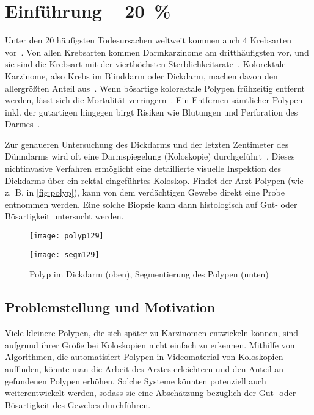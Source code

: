 \chapter{Einführung -- 20~\%}

Unter den 20 häufigsten Todesursachen weltweit kommen auch 4 Krebsarten vor~\cite{Lozano.2012}.
Von allen Krebsarten kommen Darmkarzinome am dritthäufigsten vor, und sie sind die Krebsart mit der vierthöchsten Sterblichkeitsrate~\cite{Ferlay.2012}.
Kolorektale Karzinome, also Krebs im Blinddarm oder Dickdarm, machen davon den allergrößten Anteil aus~\cite{Kumar.2005}.
Wenn bösartige kolorektale Polypen frühzeitig entfernt werden, lässt sich die Mortalität verringern~\cite{Zauber.2012}.
Ein Entfernen sämtlicher Polypen inkl. der gutartigen hingegen birgt Risiken wie Blutungen und Perforation des Darmes~\cite{Rex.2009}.

Zur genaueren Untersuchung des Dickdarms und der letzten Zentimeter des Dünndarms wird oft eine Darmspiegelung (Koloskopie) durchgeführt~\cite{Schachschal.2010}.
Dieses nichtinvasive Verfahren ermöglicht eine detaillierte visuelle Inspektion des Dickdarms über ein rektal eingeführtes Koloskop.
Findet der Arzt Polypen (wie z.~B. in \autoref{fig:polyp}), kann von dem verdächtigen Gewebe direkt eine Probe entnommen werden.
Eine solche Biopsie kann dann histologisch auf Gut- oder Bösartigkeit untersucht werden.

\begin{figure}[h]
	\centering
	\texttt{[image: polyp129]}

	\vspace{\baselineskip}

	\texttt{[image: segm129]}
	\caption{Polyp im Dickdarm (oben), Segmentierung des Polypen (unten)}
	\label{fig:polyp}
\end{figure}



\section{Problemstellung und Motivation}

Viele kleinere Polypen, die sich später zu Karzinomen entwickeln können, sind aufgrund ihrer Größe bei Koloskopien nicht einfach zu erkennen.
Mithilfe von Algorithmen, die automatisiert Polypen in Videomaterial von Koloskopien auffinden, könnte man die Arbeit des Arztes erleichtern und den Anteil an gefundenen Polypen erhöhen.
Solche Systeme könnten potenziell auch weiterentwickelt werden, sodass sie eine Abschätzung bezüglich der Gut- oder Bösartigkeit des Gewebes durchführen.

